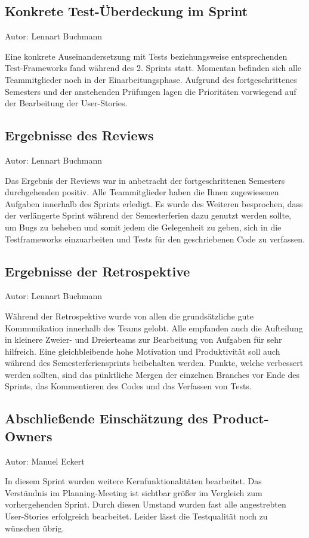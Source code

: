\subsection{Konkrete Test-Überdeckung im Sprint}
{\small Autor: Lennart Buchmann}

Eine konkrete Auseinandersetzung mit Tests beziehungsweise entsprechenden Test-Frameworks fand während des 2. Sprints statt. Momentan befinden sich alle Teammitglieder noch in der Einarbeitungsphase. Aufgrund des fortgeschrittenes Semesters und der anstehenden Prüfungen lagen die Prioritäten vorwiegend auf der Bearbeitung der User-Stories. 


\subsection{Ergebnisse des Reviews}
{\small Autor: Lennart Buchmann}

Das Ergebnis der Reviews war in anbetracht der fortgeschrittenen Semesters durchgehenden positiv. Alle Teammitglieder haben die Ihnen zugewiesenen Aufgaben innerhalb des Sprints erledigt. 
Es wurde des Weiteren besprochen, dass der verlängerte Sprint während der Semesterferien dazu genutzt werden sollte, um Bugs zu beheben und somit jedem die Gelegenheit zu geben, sich in die Testframeworks einzuarbeiten und Tests für den geschriebenen Code zu verfassen.


\subsection{Ergebnisse der Retrospektive}
{\small Autor:  Lennart Buchmann}

Während der Retrospektive wurde von allen die grundsätzliche gute Kommunikation innerhalb des Teams gelobt. Alle empfanden auch die Aufteilung in kleinere Zweier- und Dreierteams zur Bearbeitung von Aufgaben für sehr hilfreich.  Eine gleichbleibende hohe Motivation und Produktivität soll auch während des Semesterferiensprints beibehalten werden. Punkte, welche verbessert werden sollten, sind das pünktliche Mergen der einzelnen Branches vor Ende des Sprints, das Kommentieren des Codes und das Verfassen von Tests. 


\subsection{Abschließende Einschätzung des Product-Owners}
{\small Autor: Manuel Eckert}

In diesem Sprint wurden weitere Kernfunktionalitäten bearbeitet. Das Verständnis im Planning-Meeting ist sichtbar größer im Vergleich zum vorhergehenden Sprint. Durch diesen Umstand wurden fast alle angestrebten User-Stories erfolgreich bearbeitet. Leider lässt die Testqualität noch zu wünschen übrig.

